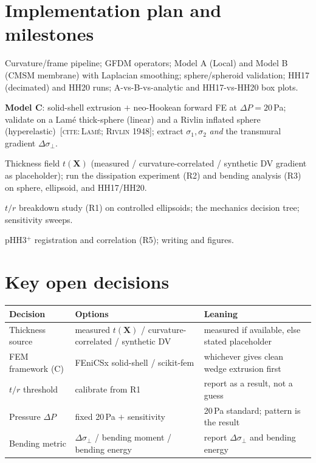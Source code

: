 \documentclass[11pt]{article}
\newcommand{\thk}{t(\mathbf{X})}
\newcommand{\dsig}{\Delta\sigma_{\perp}}      %
\newcommand{\tor}{t/r}                          %
\newcommand{\citeneed}[1]{{\small\color{blue!55!black}\textsc{[cite:\,#1]}}}
\begin{document}
\section{Implementation plan and milestones}
\begin{description}[leftmargin=1.4em,style=nextline]
  \item[Phase 1 --- \textsc{done}] Curvature/frame pipeline; GFDM operators; Model A (Local)
        and Model B (CMSM membrane) with Laplacian smoothing; sphere/spheroid validation; HH17
        (decimated) and HH20 runs; A-vs-B-vs-analytic and HH17-vs-HH20 box plots.
  \item[Phase 2 --- next] \textbf{Model C}: solid-shell extrusion $+$ neo-Hookean forward FE at
        $\Delta P=20$\,Pa; validate on a Lam\'e thick-sphere (linear) and a Rivlin inflated
        sphere (hyperelastic)~\citeneed{Lam\'e; Rivlin 1948}; extract $\sigma_1,\sigma_2$
        \emph{and} the transmural gradient $\dsig$.
  \item[Phase 3] Thickness field $\thk$ (measured / curvature-correlated / synthetic DV
        gradient as placeholder); run the dissipation experiment (R2) and bending analysis (R3)
        on sphere, ellipsoid, and HH17/HH20.
  \item[Phase 4] $\tor$ breakdown study (R1) on controlled ellipsoids; the mechanics decision
        tree; sensitivity sweeps.
  \item[Phase 5] pHH3$^+$ registration and correlation (R5); writing and figures.
\end{description}

\section{Key open decisions}
\begin{table}[h]\centering\small
\begin{tabular}{lll}
\toprule
\textbf{Decision} & \textbf{Options} & \textbf{Leaning} \\
\midrule
Thickness source     & measured $\thk$ / curvature-correlated / synthetic DV & measured if available, else stated placeholder \\
FEM framework (C)    & FEniCSx solid-shell / scikit-fem                      & whichever gives clean wedge extrusion first \\
$\tor$ threshold     & calibrate from R1                                     & report as a result, not a guess \\
Pressure $\Delta P$  & fixed 20\,Pa $+$ sensitivity                          & 20\,Pa standard; pattern is the result \\
Bending metric       & $\dsig$ / bending moment / bending energy             & report $\dsig$ and bending energy \\
\bottomrule
\end{tabular}
\end{table}
\end{document}
